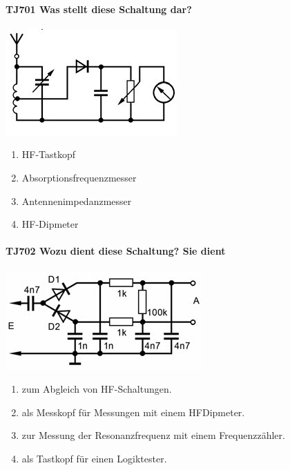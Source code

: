 \documentclass[8pt]{article}
\begin{document}
\paragraph*{TJ701 Was stellt diese Schaltung dar?}
\begin{center}
	\begin{minipage}{\linewidth}
		\centering
		\includegraphics[scale=1.0]{pics/tj701_a.jpg}
	\end{minipage}
\end{center}
\begin{enumerate}[nolistsep,label=\Alph*]
\item HF-Tastkopf
\item Absorptionsfrequenzmesser
\item Antennenimpedanzmesser
\item HF-Dipmeter
\end{enumerate}

\paragraph*{TJ702 Wozu dient diese Schaltung? Sie dient}
\begin{center}
	\begin{minipage}{\linewidth}
		\centering
		\includegraphics[scale=1.0]{pics/tj702_a.jpg}
	\end{minipage}
\end{center}
\begin{enumerate}[nolistsep,label=\Alph*]
\item zum Abgleich von HF-Schaltungen.
\item als Messkopf für Messungen mit einem HFDipmeter.
\item zur Messung der Resonanzfrequenz mit einem Frequenzzähler.
\item als Tastkopf für einen Logiktester.
\end{enumerate}
\end{document}
